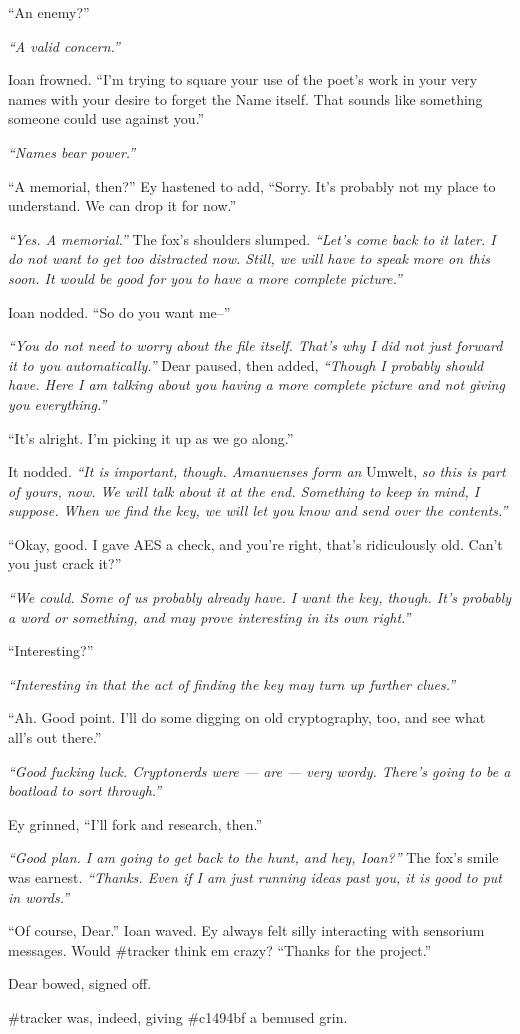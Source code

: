 ``An enemy?''

\emph{``A valid concern.''}

Ioan frowned. ``I'm trying to square your use of the poet's work in your very names with your desire to forget the Name itself. That sounds like something someone could use against you.''

\emph{``Names bear power.''}

``A memorial, then?'' Ey hastened to add, ``Sorry. It's probably not my place to understand. We can drop it for now.''

\emph{``Yes. A memorial.''} The fox's shoulders slumped. \emph{``Let's come back to it later. I do not want to get too distracted now. Still, we will have to speak more on this soon. It would be good for you to have a more complete picture.''}

Ioan nodded. ``So do you want me--''

\emph{``You do not need to worry about the file itself. That's why I did not just forward it to you automatically.''} Dear paused, then added, \emph{``Though I probably should have. Here I am talking about you having a more complete picture and not giving you everything.''}

``It's alright. I'm picking it up as we go along.''

It nodded. \emph{``It is important, though. Amanuenses form an} Umwelt, \emph{so this is part of yours, now. We will talk about it at the end. Something to keep in mind, I suppose. When we find the key, we will let you know and send over the contents.''}

``Okay, good. I gave AES a check, and you're right, that's ridiculously old. Can't you just crack it?''

\emph{``We could. Some of us probably already have. I want the key, though. It's probably a word or something, and may prove interesting in its own right.''}

``Interesting?''

\emph{``Interesting in that the act of finding the key may turn up further clues.''}

``Ah. Good point. I'll do some digging on old cryptography, too, and see what all's out there.''

\emph{``Good fucking luck. Cryptonerds were — are — very wordy. There's going to be a boatload to sort through.''}

Ey grinned, ``I'll fork and research, then.''

\emph{``Good plan. I am going to get back to the hunt, and hey, Ioan?''} The fox's smile was earnest. \emph{``Thanks. Even if I am just running ideas past you, it is good to put in words.''}

``Of course, Dear.'' Ioan waved. Ey always felt silly interacting with sensorium messages. Would \#tracker think em crazy? ``Thanks for the project.''

Dear bowed, signed off.

\#tracker was, indeed, giving \#c1494bf a bemused grin.
